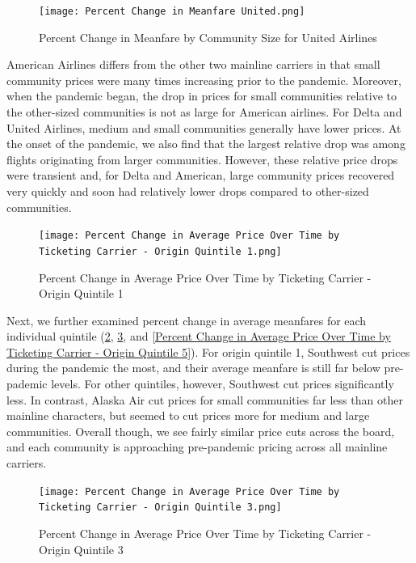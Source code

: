 \documentclass[11pt]{article}
\begin{document}
\begin{figure}[htbp!]
\centerline{\texttt{[image: Percent Change in Meanfare United.png]}}
  \label{Percent Change in Meanfare United}
    \caption{Percent Change in Meanfare by Community Size for United Airlines}
\end{figure}
American Airlines differs from the other two mainline carriers in that small community prices were many times increasing prior to the pandemic. Moreover, when the pandemic began, the drop in prices for small communities relative to the other-sized communities is not as large for American airlines. For Delta and United Airlines, medium and small communities generally have lower prices. At the onset of the pandemic, we also find that the largest relative drop was among flights originating from larger communities. However, these relative price drops were transient and, for Delta and American, large community prices recovered very quickly and soon had relatively lower drops compared to other-sized communities. 





\begin{figure}[htbp!]
\centerline{\texttt{[image: Percent Change in Average Price Over Time by Ticketing Carrier - Origin Quintile 1.png]}}
  \label{Percent Change in Average Price Over Time by Ticketing Carrier - Origin Quintile 1}
\caption{Percent Change in Average Price Over Time by Ticketing Carrier - Origin Quintile 1}
\end{figure}
Next, we further examined percent change in average meanfares for each individual quintile (\cref{Percent Change in Average Price Over Time by Ticketing Carrier - Origin Quintile 1}, \cref{Percent Change in Average Price Over Time by Ticketing Carrier - Origin Quintile 3}, and \cref{Percent Change in Average Price Over Time by Ticketing Carrier - Origin Quintile 5}). For origin quintile 1, Southwest cut prices during the pandemic the most, and their average meanfare is still far below pre-pademic levels. For other quintiles, however, Southwest cut prices significantly less. In contrast, Alaska Air cut prices for small communities far less than other mainline characters, but seemed to cut prices more for medium and large communities. Overall though, we see fairly similar price cuts across the board, and each community is approaching pre-pandemic pricing across all mainline carriers.

\begin{figure}[htbp!]
\centerline{\texttt{[image: Percent Change in Average Price Over Time by Ticketing Carrier - Origin Quintile 3.png]}}
  \label{Percent Change in Average Price Over Time by Ticketing Carrier - Origin Quintile 3}
  \caption{Percent Change in Average Price Over Time by Ticketing Carrier - Origin Quintile 3}

\end{figure}
\end{document}
